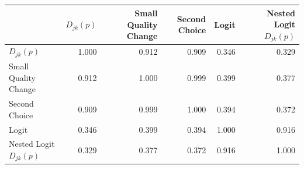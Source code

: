 \begin{tabular}{lrrrrr}
\hline
                            &   $ D_{jk}(p) $ &   Small Quality Change &   Second Choice &   Logit &   Nested Logit $ D_{jk}(p) $ \\
\hline
 $ D_{jk}(p) $              &           1.000 &                  0.912 &           0.909 &   0.346 &                        0.329 \\
 Small Quality Change       &           0.912 &                  1.000 &           0.999 &   0.399 &                        0.377 \\
 Second Choice              &           0.909 &                  0.999 &           1.000 &   0.394 &                        0.372 \\
 Logit                      &           0.346 &                  0.399 &           0.394 &   1.000 &                        0.916 \\
 Nested Logit $ D_{jk}(p) $ &           0.329 &                  0.377 &           0.372 &   0.916 &                        1.000 \\
\hline
\end{tabular}